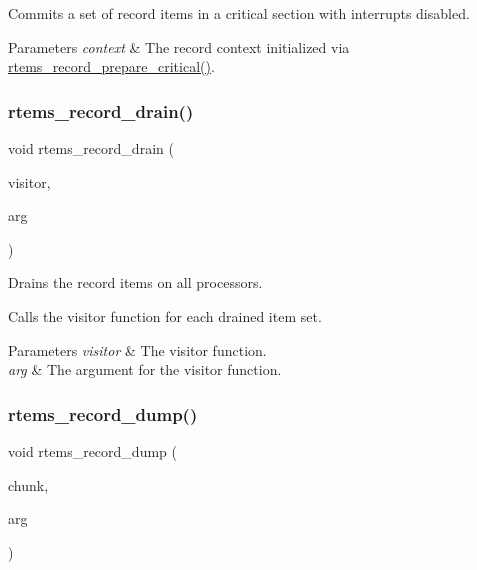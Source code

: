 Commits a set of record items in a critical section with interrupts disabled. 


\begin{DoxyParams}{Parameters}
{\em context} & The record context initialized via \mbox{\hyperlink{group__RTEMSRecord_ga0a5b38b980ea05d87c3aa22844357575}{rtems\+\_\+record\+\_\+prepare\+\_\+critical()}}. \\
\hline
\end{DoxyParams}
\mbox{\label{group__RTEMSRecord_ga99ed015930e0cc3e9c1a802b80dacb69}} 
\subsubsection{\texorpdfstring{rtems\_record\_drain()}{rtems\_record\_drain()}}
{\footnotesize\ttfamily void rtems\+\_\+record\+\_\+drain (\begin{DoxyParamCaption}\item[{rtems\+\_\+record\+\_\+drain\+\_\+visitor}]{visitor,  }\item[{void $\ast$}]{arg }\end{DoxyParamCaption})}



Drains the record items on all processors. 

Calls the visitor function for each drained item set.


\begin{DoxyParams}{Parameters}
{\em visitor} & The visitor function. \\
\hline
{\em arg} & The argument for the visitor function. \\
\hline
\end{DoxyParams}
\mbox{\label{group__RTEMSRecord_gaaf0596e7f638ba4a1acbf1f7b1c9be4f}} 
\subsubsection{\texorpdfstring{rtems\_record\_dump()}{rtems\_record\_dump()}}
{\footnotesize\ttfamily void rtems\+\_\+record\+\_\+dump (\begin{DoxyParamCaption}\item[{\mbox{\hyperlink{group__RTEMSRecord_gad5d67c09a47fe0f93067be3667db7ce0}{rtems\+\_\+record\+\_\+dump\+\_\+chunk}}}]{chunk,  }\item[{void $\ast$}]{arg }\end{DoxyParamCaption})}



